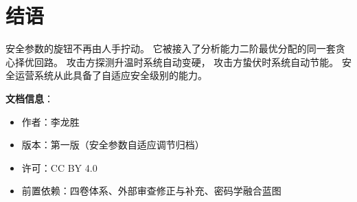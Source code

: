 \documentclass[11pt,a4paper]{article}
\begin{document}
\section{结语}

安全参数的旋钮不再由人手拧动。
它被接入了分析能力二阶最优分配的同一套贪心择优回路。
攻击方探测升温时系统自动变硬，
攻击方蛰伏时系统自动节能。
安全运营系统从此具备了自适应安全级别的能力。

\vspace{5mm}
\noindent\textbf{文档信息}：
\begin{itemize}
    \item 作者：李龙胜
    \item 版本：第一版（安全参数自适应调节归档）
    \item 许可：CC BY 4.0
    \item 前置依赖：四卷体系、外部审查修正与补充、密码学融合蓝图
\end{itemize}
\end{document}
